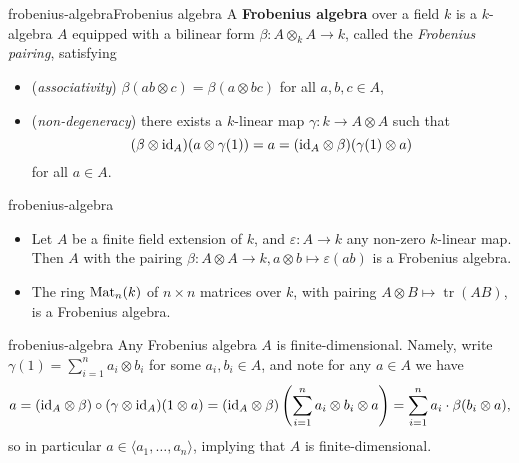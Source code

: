\begin{topic}{frobenius-algebra}{Frobenius algebra}
    A \textbf{Frobenius algebra} over a field $k$ is a $k$-algebra $A$ equipped with a bilinear form $\beta : A \otimes_k A \to k$, called the \textit{Frobenius pairing}, satisfying
    \begin{itemize}
        \item (\textit{associativity}) $\beta(ab \otimes c) = \beta(a \otimes bc)$ for all $a, b, c \in A$,
        \item (\textit{non-degeneracy}) there exists a $k$-linear map $\gamma : k \to A \otimes A$ such that 
        \[ (\beta \otimes \text{id}_A)(a \otimes \gamma(1)) = a = (\text{id}_A \otimes \beta)(\gamma(1) \otimes a) \]
        for all $a \in A$.
    \end{itemize}
\end{topic}

\begin{example}{frobenius-algebra}
    \begin{itemize}
        \item Let $A$ be a finite field extension of $k$, and $\varepsilon : A \to k$ any non-zero $k$-linear map. Then $A$ with the pairing $\beta : A \otimes A \to k, a \otimes b \mapsto \varepsilon(ab)$ is a Frobenius algebra.
        \item The ring $\textup{Mat}_n(k)$ of $n \times n$ matrices over $k$, with pairing $A \otimes B \mapsto \operatorname{tr}(AB)$, is a Frobenius algebra.
    \end{itemize}
\end{example}

\begin{example}{frobenius-algebra}
    Any Frobenius algebra $A$ is finite-dimensional. Namely, write $\gamma(1) = \sum_{i = 1}^{n} a_i \otimes b_i$ for some $a_i, b_i \in A$, and note for any $a \in A$ we have
    \[ a = (\text{id}_A \otimes \beta) \circ (\gamma \otimes \text{id}_A)(1 \otimes a) = (\text{id}_A \otimes \beta) \left( \sum_{i = 1}^{n} a_i \otimes b_i \otimes a \right) = \sum_{i = 1}^{n} a_i \cdot \beta(b_i \otimes a) , \]
    so in particular $a \in \langle a_1, \ldots, a_n \rangle$, implying that $A$ is finite-dimensional.
\end{example}

